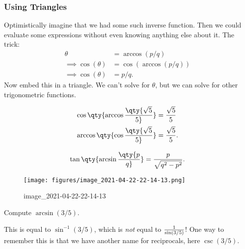 \hypertarget{using-triangles}{%
\subsubsection{Using Triangles}\label{using-triangles}}

\begin{remark}

Optimistically imagine that we had some such inverse function. Then we
could evaluate some expressions without even knowing anything else about
it. The trick:
\begin{align*}
\theta &= \arccos(p/q) \\
\implies \cos(\theta) &= \cos(\arccos(p/q)) \\
\implies \cos(\theta) &= p/q
.\end{align*}
Now embed this in a triangle. We can't solve for \(\theta\), but we can
solve for other trigonometric functions.

\end{remark}

\begin{exercise}

\begin{align*}
\cos\qty{ \arccos\qty{ \sqrt 5 \over 5 } } &= {\sqrt 5 \over 5} \\
\arccos\qty{ \cos \qty{ \sqrt 5 \over 5 } } &= {\sqrt 5 \over 5}
.\end{align*}

\end{exercise}

\begin{exercise}

\begin{align*}
\tan\qty{ \arcsin\qty{ p \over q } } = {p \over \sqrt{q^2 - p^2} }
.\end{align*}

\begin{figure}
\centering
\texttt{[image: figures/image\_2021-04-22-22-14-13.png]}
\caption{image\_2021-04-22-22-14-13}
\end{figure}

\end{exercise}

\begin{exercise}

Compute \(\arcsin(3/5)\).

\begin{warnings}

This is equal to \(\sin^{-1}(3/5)\), which is \emph{not} equal to
\({1\over \sin(3/5)}\)! One way to remember this is that we have another
name for reciprocals, here \(\csc(3/5)\).

\end{warnings}

\end{exercise}

